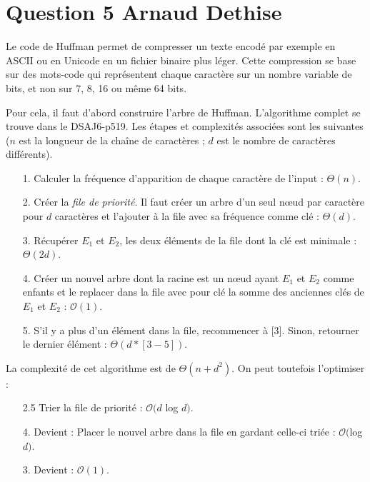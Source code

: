 \documentclass[10pt,a4paper]{article}
\begin{document}
\section*{Question 5 Arnaud Dethise}

	Le code de Huffman permet de compresser un texte encodé par exemple en ASCII ou en Unicode en un fichier binaire plus léger. Cette compression se base sur des mots-code qui représentent chaque caractère sur un nombre variable de bits, et non sur 7, 8, 16 ou même 64 bits.
	
	Pour cela, il faut d'abord construire l'arbre de Huffman. L'algorithme complet se trouve dans le DSAJ6-p519. Les étapes et complexités associées sont les suivantes ($n$ est la longueur de la chaîne de caractères ; $d$ est le nombre de caractères différents).
	\vspace{0.3cm}
	
	\begin{enumerate}
	\item[1.] Calculer la fréquence d'apparition de chaque caractère de l'input : $\Theta(n)$.
	\item[2.] Créer la \textit{file de priorité}. Il faut créer un arbre d'un seul nœud par caractère pour $d$ caractères et l'ajouter à la file avec sa fréquence comme clé : $\Theta(d)$.
	\item[3.] Récupérer $E_1$ et $E_2$, les deux éléments de la file dont la clé est minimale : $\Theta(2d)$.
	\item[4.] Créer un nouvel arbre dont la racine est un nœud ayant $E_1$ et $E_2$ comme enfants et le replacer dans la file avec pour clé la somme des anciennes clés de $E_1$ et $E_2$ : $\mathcal{O}(1)$.
	\item[5.] S'il y a plus d'un élément dans la file, recommencer à [3]. Sinon, retourner le dernier élément : $\Theta(d*[3-5])$.
	\end{enumerate}
	\vspace{0.3cm}
	
	La complexité de cet algorithme est de $\Theta(n + d^2)$. On peut toutefois l'optimiser :
	\vspace{0.3cm}
	
	\begin{enumerate}
	\item[2.5] Trier la file de priorité : $\mathcal{O}(d $ log $d)$.
	\item[4.] Devient : Placer le nouvel arbre dans la file en gardant celle-ci triée : $\mathcal{O}($log $d)$.
	\item[3.] Devient : $\mathcal{O}(1)$.
	\end{enumerate}
	\vspace{0.3cm}
	
\end{document}
